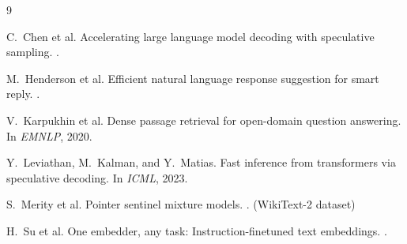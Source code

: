 \documentclass[twocolumn,10pt]{article}
\begin{document}

\begin{thebibliography}{9}

C.~Chen et al.
\newblock Accelerating large language model decoding with speculative sampling.
.

M.~Henderson et al.
\newblock Efficient natural language response suggestion for smart reply.
.

V.~Karpukhin et al.
\newblock Dense passage retrieval for open-domain question answering.
\newblock In \emph{EMNLP}, 2020.

Y.~Leviathan, M.~Kalman, and Y.~Matias.
\newblock Fast inference from transformers via speculative decoding.
\newblock In \emph{ICML}, 2023.

S.~Merity et al.
\newblock Pointer sentinel mixture models.
. (WikiText-2 dataset)

H.~Su et al.
\newblock One embedder, any task: Instruction-finetuned text embeddings.
.

\end{thebibliography}
\end{document}
